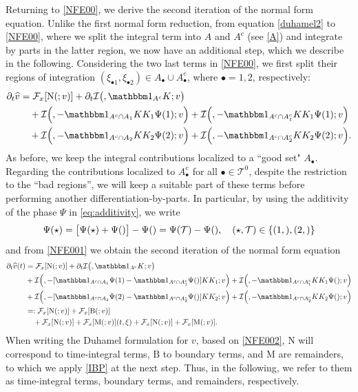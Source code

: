 \documentclass[%
11pt,  reqno]{amsart}
\makeatletter
\newcommand{\5}{\textup{V}}
\newcommand{\ft}{\widehat}
\newcommand{\ind}{\mathbbm 1}
\newcommand{\dt}{\partial_t}
\theoremstyle{remark}
\newcommand{\bul}{\bullet}
\newcommand{\TT}{\mathcal{T}}
\newcommand{\Ft}{{\mathcal{F}}}
\def\<#1>{\csname MH@symb@#1\endcsname}
\def\distC{15}
\newcommand{\cherry}[3]{
	\begin{tikzpicture}[
		baseline=-8, scale=0.6, every node/.style={dotA},
		level distance=15pt,
		level 1/.style={sibling distance=\distC pt}
		]
		\node  [label=above:{$#1$}]  (root) {}
		child
		child
		;
		\node [label= left:{$#2$}]  at (root-1) {};
		\node [label= right:{$#3$}] at (root-2) {};
	\end{tikzpicture}
}
\newcommand{\Ical}{\mathcal{I}}
\numberwithin{equation}{section}
\numberwithin{theorem}{section}
\newcommand{\MM}{\mathrm{M}}
\newcommand{\NN}{\mathrm{N}}
\newcommand{\BB}{\mathrm{B}}
\makeatother
\begin{document}
Returning to \eqref{NFE00}, we derive the second iteration of the normal form equation. 
Unlike the first normal form reduction, from equation \eqref{duhamel2} to \eqref{NFE00}, where we split the integral term into $A$ and $A^c$ (see \eqref{A}) and integrate by parts in the latter region, we now have an additional step, which we describe in the following. Considering the two last terms in \eqref{NFE00}, we first split their regions of integration $(\xi_{\bul1}, \xi_{\bul2}) \in A_\bul \cup A_\bul^c$, where $\bul = 1,2$, respectively:
\begin{align}
\label{NFE001}
\dt\ft v
&
= 
 \Ft_x[ \NN ( \<1>; v )]  
+ 
\dt \Ical \big( \<1>,  \ind_{A^c} K; v \big)
\\
&
\quad 
+
\Ical \Big( \<21>, - \ind_{A^c \cap A_1} KK_1\Psi(1) ; v  \Big)  
+
\Ical \Big( \<21>, - \ind_{A^c \cap A_1^c} KK_1\Psi(1) ; v  \Big) 
\\
&
\quad 
+
\Ical \Big( \<22>, - \ind_{A^c \cap A_2} KK_2\Psi(2) ; v  \Big) 
+
\Ical \Big( \<22>, - \ind_{A^c \cap A_2^c} KK_2\Psi(2) ; v  \Big) .
\end{align}
As before, we keep the integral contributions localized to a ``good set" $A_\bul$. Regarding the contributions localized to $A_\bul^c$ for all $\bul\in \TT^0$, despite the restriction to the ``bad regions'', we will keep a suitable part of these terms before performing another differentiation-by-parts. In particular, by using the additivity of the phase $\Psi$ in \eqref{eq:additivity}, we write
\begin{align}
\Psi(\star) 
= \big[ \Psi(\star) + \Psi(\<1>) \big]- \Psi(\<1>) 
=
\Psi(\TT) - \Psi(\<1>),
\quad (\star, \TT)\in \left\{ (1, \<21>) , (2, \<22>) \right\}
\end{align}
and from \eqref{NFE001} we obtain the second iteration of the normal form equation
\begin{align}
\dt\ft v(t) 
&
= 
 \Ft_x[ \NN ( \<1>; v )] 
+ 
\dt \Ical \big( \<1>,  \ind_{A^c} K; v \big)
\\
&
+
\Ical \Big( \<21>, -[ \ind_{A^c \cap A_1} \Psi(1) - \ind_{A^c \cap A_1^c} \Psi(\<1>)  ]KK_1 ; v  \Big) 
+
\Ical \Big( \<21>, - \ind_{A^c \cap A_1^c} KK_1\Psi(\<21>) ; v  \Big) 
\\
&
+
\Ical \Big( \<22>, - [\ind_{A^c \cap A_2} \Psi(2) - \ind_{A^c \cap A_2^c} \Psi(\<1>)  ] KK_2; v  \Big) 
+
\Ical \Big( \<22>, - \ind_{A^c \cap A_2^c} KK_2\Psi(\<22>) ; v  \Big) 
\\
&
= : 
 \Ft_x[ \NN ( \<1>; v )]  
+ 
 \Ft_x[ 
\BB(\<1>;v)
] 
\\
&
\quad 
+ 
 \Ft_x[ 
\NN(\<21>; v )
] 
+
 \Ft_x[ 
\MM(\<21>; v )
] (t, \xi) 
+
 \Ft_x[ 
\NN(\<22>; v)
]  
+
 \Ft_x[ 
\MM(\<22>;v)
]  
.
\label{NFE002}
\end{align}
When writing the Duhamel formulation for $v$, based on \eqref{NFE002}, $\NN$ will correspond to time-integral terms, $\BB$ to boundary terms, and $\MM$ are remainders, to which we apply \eqref{IBP} at the next step. Thus, in the following, we refer to them as time-integral terms, boundary terms, and remainders, respectively.
\end{document}
